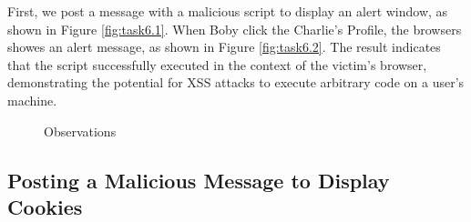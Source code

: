 \documentclass[a4paper,11pt]{article}
\begin{document}
First, we post a message with a malicious script to display an alert window, as shown in Figure \ref{fig:task6.1}. When Boby click the Charlie's Profile, the browsers showes an alert message, as shown in Figure \ref{fig:task6.2}. The result indicates that the script successfully executed in the context of the victim's browser, demonstrating the potential for XSS attacks to execute arbitrary code on a user's machine.
\begin{figure}[h]
    \centering
    \hfill
    \hfill
    \caption{Observations}\label{fig:task6}
\end{figure}

\subsection{Posting a Malicious Message to Display Cookies}
\end{document}
